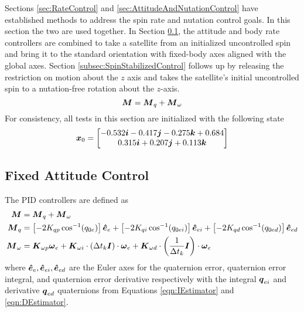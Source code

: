 Sections \ref{sec:RateControl} and \ref{sec:AttitudeAndNutationControl} have established methods to address the spin rate and nutation control goals.  In this section the two are used together.  In Section \ref{subsec:FixedAttitudeControl}, the attitude and body rate controllers are combined to take a satellite from an initialized uncontrolled spin and bring it to the standard orientation with fixed-body axes aligned with the global axes.  Section \ref{subsec:SpinStabilizedControl} follows up by releasing the restriction on motion about the $z$ axis and takes the satellite's initial uncontrolled spin to a nutation-free rotation about the $z$-axis.
\begin{equation}
    \boldsymbol{M} = \boldsymbol{M}_{q} + \boldsymbol{M}_{\omega}
\end{equation}
For consistency, all tests in this section are initialized with the following state
\begin{equation}
  \boldsymbol{x}_0 = \begin{bmatrix} -0.532 \boldsymbol{i} -0.417 \boldsymbol{j} -0.275 \boldsymbol{k} +0.684 \\ 0.315 \boldsymbol{i} +0.207 \boldsymbol{j} +0.113 \boldsymbol{k} \end{bmatrix}
\end{equation}

\subsection{Fixed Attitude Control}
\label{subsec:FixedAttitudeControl}
The PID controllers are defined as
\begin{equation}
  \begin{aligned}
    \boldsymbol{M} &= \boldsymbol{M}_{q} + \boldsymbol{M}_{\omega} \\
    \boldsymbol{M}_{q} &= \left[-2 K_{qp} \cos^{-1} (q_{0e}) \right] \boldsymbol{\hat{e}}_e + \left[-2 K_{qi} \cos^{-1} (q_{0ei}) \right] \boldsymbol{\hat{e}}_{ei} + \left[-2 K_{qd} \cos^{-1} (q_{0ed}) \right] \boldsymbol{\hat{e}}_{ed} \\
    \boldsymbol{M}_{\omega} &= \boldsymbol{K}_{\omega p} \boldsymbol{\omega}_e + \boldsymbol{K}_{\omega i} \cdot (\Delta t_k \boldsymbol{I})\cdot \boldsymbol{\omega}_e + \boldsymbol{K}_{\omega d} \cdot \left(\frac{1}{\Delta t_k} \boldsymbol{I}\right) \cdot \boldsymbol{\omega}_e
  \end{aligned}
\end{equation}
where $\boldsymbol{\hat{e}}_e, \boldsymbol{\hat{e}}_{ei}, \boldsymbol{\hat{e}}_{ed}$ are the Euler axes for the quaternion error, quaternion error integral, and quaternion error derivative respectively with the integral $\boldsymbol{q}_{ei}$ and derivative $\boldsymbol{q}_{ed}$ quaternions from Equations \ref{eqn:IEstimator} and \ref{eqn:DEstimator}.

